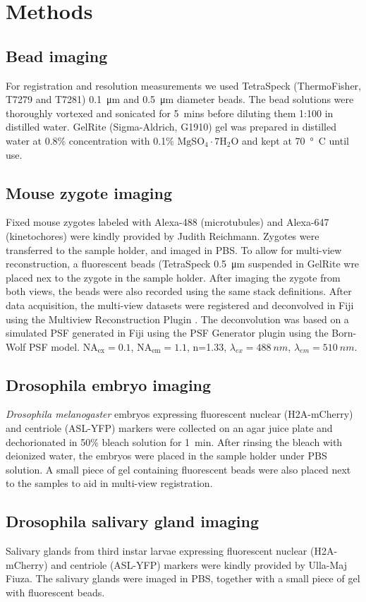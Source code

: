 \section{Methods}

  \subsection{Bead imaging}
    For registration and resolution measurements we used TetraSpeck (ThermoFisher, T7279 and T7281) \SI{0.1}{\micro m} and \SI{0.5}{\micro m} diameter beads. The bead solutions were thoroughly vortexed and sonicated for \SI{5}{mins} before diluting them 1:100 in distilled water. GelRite (Sigma-Aldrich, G1910) gel was prepared in distilled water at 0.8\% concentration with 0.1\% $\mathrm{MgSO_4\cdot 7 H_2O}$ and kept at \SI{70}{\degree C} until use. 

  \subsection{Mouse zygote imaging}
    Fixed mouse zygotes labeled with Alexa-488 (microtubules) and Alexa-647 (kinetochores) were kindly provided by Judith Reichmann. Zygotes were transferred to the sample holder, and imaged in PBS. To allow for multi-view reconstruction, a fluorescent beads (TetraSpeck \SI{0.5}{\micro m} suspended in GelRite wre placed nex to the zygote in the sample holder. After imaging the zygote from both views, the beads were also recorded using the same stack definitions. After data acquisition, the multi-view datasets were registered and deconvolved in Fiji \cite{schindelin_fiji:_2012} using the Multiview Reconstruction Plugin \cite{preibisch_software_2010,preibisch_efficient_2014}. The deconvolution was based on a simulated PSF generated in Fiji using the PSF Generator plugin \cite{kirshner_3d_2011} using the Born-Wolf PSF model. $\mathrm{NA_{ex}}=0.1$, $\mathrm{NA_{em}}=1.1$, n=1.33, $\lambda_{ex} = \SI{488}{nm}$, $\lambda_{em} = \SI{510}{nm}$.

  \subsection{Drosophila embryo imaging}
    \textit{Drosophila melanogaster} embryos expressing fluorescent nuclear (H2A-mCherry) and centriole (ASL-YFP) markers were collected on an agar juice plate and dechorionated in 50\% bleach solution for \SI{1}{min}. After rinsing the bleach with deionized water, the embryos were placed in the sample holder under PBS solution. A small piece of gel containing fluorescent beads were also placed next to the samples to aid in multi-view registration.

  \subsection{Drosophila salivary gland imaging}
    Salivary glands from third instar larvae expressing fluorescent nuclear (H2A-mCherry) and centriole (ASL-YFP) markers were kindly provided by Ulla-Maj Fiuza. The salivary glands were imaged in PBS, together with a small piece of gel with fluorescent beads.
